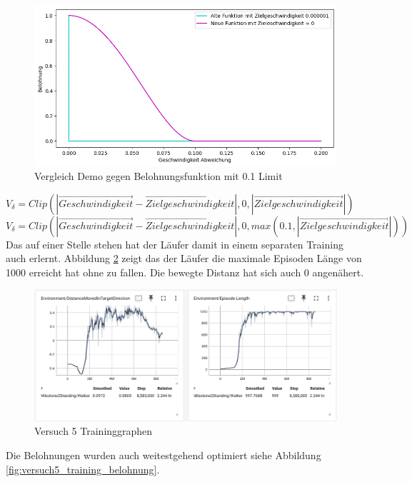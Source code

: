 \begin{figure}[H]
  \centering  
  \includegraphics[scale=0.5]{img/match_velocity_vergleich_clip.png}
  \caption{Vergleich Demo gegen Belohnungsfunktion mit 0.1 Limit}
  \label{fig:match_velocity_vergleich_clip}
\end{figure}
$V_\delta=Clip(|\vec{Geschwindigkeit} - \vec{Zielgeschwindigkeit}|, 0, |\vec{Zielgeschwindigkeit}|)$ \\
$V_\delta=Clip(|\vec{Geschwindigkeit} - \vec{Zielgeschwindigkeit}|, 0, max(0.1, |\vec{Zielgeschwindigkeit}|))$ \\

Das auf einer Stelle stehen hat der Läufer damit in einem separaten Training auch erlernt. Abbildung \ref{fig:versuch5_training} zeigt das der Läufer die maximale Episoden Länge von 1000 erreicht hat ohne zu fallen. Die bewegte Distanz hat sich auch 0 angenähert.

\begin{figure}[H]
  \centering  
  \includegraphics[scale=0.5]{img/versuch5_training.png}
  \caption{Versuch 5 Traininggraphen}
  \label{fig:versuch5_training}
\end{figure}

Die Belohnungen wurden auch weitestgehend optimiert siehe Abbildung \ref{fig:versuch5_training_belohnung}.

